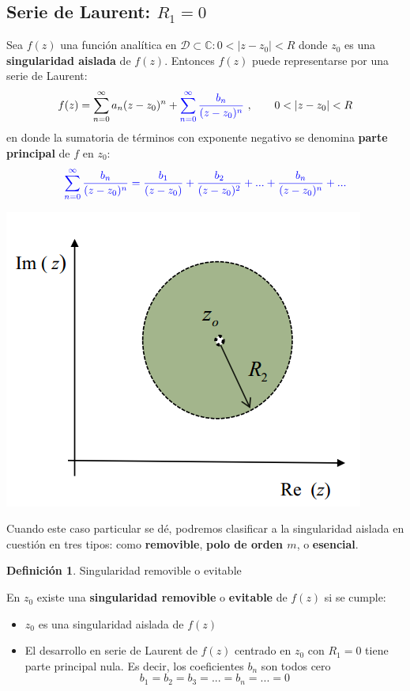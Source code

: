 \documentclass[12pt]{article}
\theoremstyle{definition}
\newtheorem{definition}{Definici\'on}[section]
\theoremstyle{theorem}
\theoremstyle{corolary}
\theoremstyle{method}
\begin{document}
\subsection{Serie de Laurent: $R_1=0$}
Sea $f(z)$ una funci\'on anal\'itica en $\mathcal{D} \subset \mathbb{C}:0<|z-z_0|<R$ donde $z_0$ es una \textbf{singularidad aislada} de $f(z)$. Entonces $f(z)$ puede representarse por una serie de Laurent:
$$f(z)=\sum\limits_{n=0}^{\infty}a_n(z-z_0)^n+{\color{blue}\sum\limits_{n=0}^{\infty}\frac{b_n}{(z-z_0)^n}}\ ,\qquad 0<|z-z_0|<R$$
en donde la sumatoria de t\'erminos con exponente negativo se denomina \textbf{parte principal} de $f$ en $z_0$: $$\color{blue}\sum\limits_{n=0}^{\infty}\frac{b_n}{(z-z_0)^n} = \frac{b_1}{(z-z_0)}+\frac{b_2}{(z-z_0)^2}+...+\frac{b_n}{(z-z_0)^n}+...$$

\begin{center}
	\includegraphics[scale=0.6]{entorno_red.png}
\end{center}

Cuando este caso particular se d\'e, podremos clasificar a la singularidad aislada en cuesti\'on en tres tipos: como \textbf{removible}, \textbf{polo de orden $m$}, o \textbf{esencial}.

\colorbox{yellow!40!white!80}{\parbox{\linewidth}{
\theoremstyle{definition}
\begin{definition}{Singularidad removible o evitable}

En $z_0$ existe una \textbf{singularidad removible} o \textbf{evitable} de $f(z)$ si se cumple:
\begin{itemize}
	\item $z_0$ es una singularidad aislada de $f(z)$
	\item El desarrollo en serie de Laurent de $f(z)$ centrado en $z_0$ con $R_1=0$ tiene parte principal nula. Es decir, los coeficientes $b_n$ son todos cero $$b_1=b_2=b_3=...=b_n=...=0$$
\end{itemize}
\end{definition}}}
\linebreak
\linebreak
\end{document}
